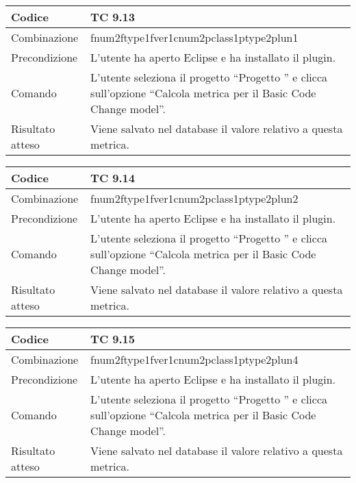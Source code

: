 \clearpage

\begin{table}[ht]
\begin{tabular}{|p{3cm}|p{9cm}|}
\hline
\cellcolor{lightgray}Codice				& TC 9.13								\\
\hline
\cellcolor{lightgray}Combinazione		& fnum2ftype1fver1cnum2pclass1ptype2plun1									\\
\hline
\cellcolor{lightgray}Precondizione		& L'utente ha aperto Eclipse e ha installato il plugin.		\\
\hline
\cellcolor{lightgray}Comando			& L'utente seleziona il progetto ``Progetto ''  e clicca sull'opzione ``Calcola metrica per il Basic Code Change model''.	\\
\hline
\cellcolor{lightgray}Risultato atteso	& Viene salvato nel database il valore relativo a questa metrica.\\
\hline
\end{tabular}
\end{table}

\begin{table}[ht]
\begin{tabular}{|p{3cm}|p{9cm}|}
\hline
\cellcolor{lightgray}Codice				& TC 9.14								\\
\hline
\cellcolor{lightgray}Combinazione		& fnum2ftype1fver1cnum2pclass1ptype2plun2									\\
\hline
\cellcolor{lightgray}Precondizione		& L'utente ha aperto Eclipse e ha installato il plugin.		\\
\hline
\cellcolor{lightgray}Comando			& L'utente seleziona il progetto ``Progetto ''  e clicca sull'opzione ``Calcola metrica per il Basic Code Change model''.	\\
\hline
\cellcolor{lightgray}Risultato atteso	& Viene salvato nel database il valore relativo a questa metrica.\\
\hline
\end{tabular}
\end{table}

\begin{table}[ht]
\begin{tabular}{|p{3cm}|p{9cm}|}
\hline
\cellcolor{lightgray}Codice				& TC 9.15								\\
\hline
\cellcolor{lightgray}Combinazione		& fnum2ftype1fver1cnum2pclass1ptype2plun4									\\
\hline
\cellcolor{lightgray}Precondizione		& L'utente ha aperto Eclipse e ha installato il plugin.		\\
\hline
\cellcolor{lightgray}Comando			& L'utente seleziona il progetto ``Progetto ''  e clicca sull'opzione ``Calcola metrica per il Basic Code Change model''.	\\
\hline
\cellcolor{lightgray}Risultato atteso	& Viene salvato nel database il valore relativo a questa metrica.\\
\hline
\end{tabular}
\end{table}

